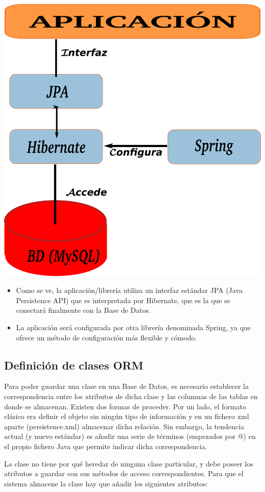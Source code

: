 \documentclass[11pt]{article}
\begin{document}
\begin{center}
\includegraphics[width=.6\textwidth]{esquemahibernate.pdf}
\end{center}




\begin{itemize}
\item Como se ve, la aplicación/librería utiliza un interfaz estándar JPA (Java Persistence API) que es
  interpretada por Hibernate, que es la que se conectará finalmente con la Base de Datos.
\item La aplicación será configurada por otra librería denominada Spring, ya que ofrece un método de
  configuración más flexible y cómodo.
\end{itemize}
\subsection{Definición de clases ORM}
\label{sec-6-2}




Para poder guardar una clase en una Base de Datos, es necesario establecer la correspondencia entre
los atributos de dicha clase y las columnas de las tablas en donde se almacenan. Existen dos formas
de proceder. Por un lado, el formato clásico era definir el objeto sin ningún tipo de información y
en un fichero xml aparte (persistence.xml) almacenar dicha relación. Sin embargo, la tendencia actual
(y nuevo estándar) es añadir una serie de términos (empezados por @) en el propio fichero Java que
permite indicar dicha correspondencia. 


La clase no tiene por qué heredar de ninguna clase particular, y debe poseer los atributos a guardar
con sus métodos de acceso correspondientes. Para que el sistema almacene la clase hay que añadir los
siguientes atributos:
\end{document}
